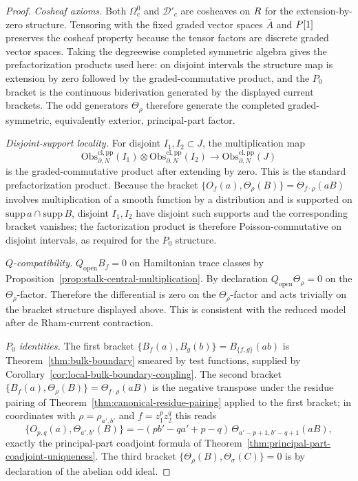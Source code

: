 \documentclass[11pt]{memoir}
\begin{document}
\begin{proof}
	  \emph{Cosheaf axioms.} Both \(\Omega_c^0\) and $\mathcal D'_c$ are
  cosheaves on $R$ for the extension-by-zero structure. Tensoring with
  the fixed graded vector spaces $\bar A$ and $P[1]$ preserves the
  cosheaf property because the tensor factors are discrete graded
  vector spaces. Taking the degreewise completed symmetric algebra gives
  the prefactorization products used here: on disjoint intervals the
  structure map is extension by zero followed by the graded-commutative
  product, and the \(P_0\) bracket is the continuous biderivation
  generated by the displayed current brackets. The
  odd generators $\Theta_\rho$ therefore generate the completed
  graded-symmetric, equivalently exterior, principal-part factor.

	  \emph{Disjoint-support locality.} For disjoint \(I_1,I_2\subset J\), the
	  multiplication map
  $$\mathrm{Obs}_{\partial,N}^{\mathrm{cl,pp}}(I_1)\otimes
    \mathrm{Obs}_{\partial,N}^{\mathrm{cl,pp}}(I_2)\longrightarrow
    \mathrm{Obs}_{\partial,N}^{\mathrm{cl,pp}}(J)$$
  is the graded-commutative product after extending by zero. This is
	  the standard prefactorization product. Because the bracket
  $\{O_f(a),\Theta_\rho(B)\}=\Theta_{f\cdot\rho}(aB)$ involves
  multiplication of a smooth function by a distribution and is
  supported on $\mathrm{supp}\,a\cap\mathrm{supp}\,B$, disjoint
  $I_1,I_2$ have disjoint such supports and the corresponding bracket
  vanishes; the factorization product is therefore
  Poisson-commutative on disjoint intervals, as required for the $P_0$
  structure.

  \emph{$Q$-compatibility.} $Q_{\mathrm{open}}B_f=0$ on Hamiltonian
  trace classes by Proposition~\ref{prop:stalk-central-multiplication}.
  By declaration $Q_{\mathrm{open}}\Theta_\rho=0$ on the
  $\Theta_\rho$-factor. Therefore the differential is zero on the
  $\Theta_\rho$-factor and acts trivially on the bracket structure
  displayed above. This is consistent with the reduced model after
  de Rham-current contraction.

  \emph{$P_0$ identities.} The first bracket
  $\{B_f(a),B_g(b)\}=B_{\{f,g\}}(ab)$ is Theorem~\ref{thm:bulk-boundary}
  smeared by test functions, supplied by
  Corollary~\ref{cor:local-bulk-boundary-coupling}. The second bracket
  $\{B_f(a),\Theta_\rho(B)\}=\Theta_{f\cdot\rho}(aB)$ is the negative
  transpose under the residue pairing of
  Theorem~\ref{thm:canonical-residue-pairing} applied to the first
  bracket; in coordinates with $\rho=\rho_{a',b'}$ and
  $f=z_1^pz_2^q$ this reads
  $$\{O_{p,q}(a),\Theta_{a',b'}(B)\}
    =-(pb'-qa'+p-q)\,\Theta_{a'-p+1,b'-q+1}(aB),$$
  exactly the principal-part coadjoint formula of
  Theorem~\ref{thm:principal-part-coadjoint-uniqueness}. The third
  bracket $\{\Theta_\rho(B),\Theta_\sigma(C)\}=0$ is by declaration of
  the abelian odd ideal.


\end{proof}
\end{document}
